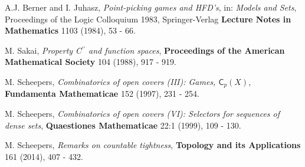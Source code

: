 \documentclass{amsart}
\begin{document}
\begin{thebibliography}{}

 A.J. Berner and I. Juhasz, \emph{Point-picking games and HFD's}, in: \emph{Models and Sets}, Proceedings of the Logic Colloquium 1983, Springer-Verlag {\bf Lecture Notes in Mathematics} 1103 (1984), 53 - 66. 


 M. Sakai, \emph{Property C$^{\prime\prime}$ and function spaces}, {\bf Proceedings of the American Mathematical Society} 104 (1988), 917 - 919.

 M. Scheepers, \emph{Combinatorics of open covers (III): Games, $\textsf{C}_p(X)$}, {\bf Fundamenta Mathematicae} 152 (1997), 231 - 254.

 M. Scheepers, \emph{Combinatorics of open covers (VI): Selectors for sequences of dense sets}, {\bf Quaestiones Mathematicae} 22:1 (1999), 109 - 130.

 M. Scheepers, \emph{Remarks on countable tightness}, {\bf Topology and its Applications} 161 (2014), 407 - 432.

\end{thebibliography}
\end{document}
